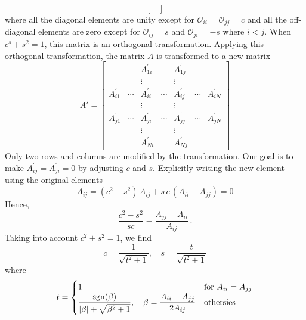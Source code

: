 {\begin{equation}
\begin{bmatrix}
\end{bmatrix}
\end{equation}
where all the diagonal elements are unity except for $\mathcal{O}_{ii}=\mathcal{O}_{jj}=c$ and all the off-diagonal elements are zero except for $\mathcal{O}_{ij}=s$ and $\mathcal{O}_{ji}=-s$  where $i<j$.  When $c^s+s^2=1$, this matrix is an orthogonal transformation. Applying this orthogonal transformation, the matrix $A$ is transformed to a new matrix
\begin{equation}
A'=
\begin{bmatrix}
               &        & A^\prime_{1i} &        & A^\prime_{1j} &        &               \\
               &        &     \vdots    &        &  \vdots       &        &               \\
 A^\prime_{i1} & \cdots & A^\prime_{ii} & \cdots & A^\prime_{ij} & \cdots & A^\prime_{iN} \\
               &        &     \vdots    &        &  \vdots       &        &               \\
 A^\prime_{j1} & \cdots & A^\prime_{ji} & \cdots & A^\prime_{jj} & \cdots & A^\prime_{jN} \\ 
               &        &     \vdots    &        &  \vdots       &        &               \\
               &        & A^\prime_{Ni} &        & A^\prime_{Nj} &        &   
\end{bmatrix}
\end{equation}
Only two rows and columns are modified by the transformation.  Our goal is to make $A^\prime_{ij}=A^\prime_{ji}=0$ by adjusting $c$ and $s$.  Explicitly writing the new element using the original elements
\begin{equation}
A^\prime_{ij} = (c^2-s^2)\, A_{ij} + s\, c\, (A_{ii}-A_{jj}) = 0
\end{equation}
Hence, 
\begin{equation}
\frac{c^2-s^2}{sc} = \frac{A_{jj}-A_{ii}}{A_{ij}}\,.
\end{equation}
Taking into account $c^2+s^2=1$, we find
\begin{equation}
c = \displaystyle\frac{1}{\sqrt{t^2+1}}, \quad s= \displaystyle\frac{t}{\sqrt{t^2+1}}
\label{eq:jacobi_cs}
\end{equation}
where
\begin{equation}
t=\begin{cases}
1 & \text{for } A_{ii}=A_{jj} \\
\displaystyle\frac{\operatorname{sgn}(\beta)}{|\beta| + \sqrt{\beta^2+1}}, \quad \beta = \displaystyle\frac{A_{ii}-A_{jj}}{2A_{ij}} & \text{othersies}
\end{cases}
\end{equation}

}
